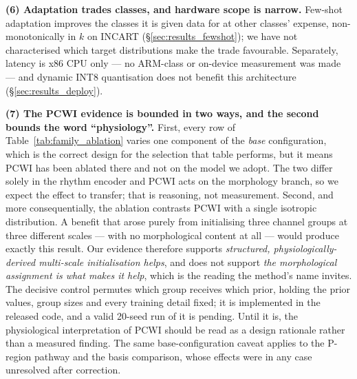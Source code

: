 \documentclass[journal,twoside,web]{ieeecolor}
\begin{document}
\noindent\textbf{(6) Adaptation trades classes, and hardware scope is narrow.} Few-shot adaptation improves the classes it is given data for at other classes' expense, non-monotonically in $k$ on INCART (\S\ref{sec:results_fewshot}); we have not characterised which target distributions make the trade favourable. Separately, latency is x86 CPU only --- no ARM-class or on-device measurement was made --- and dynamic INT8 quantisation does not benefit this architecture (\S\ref{sec:results_deploy}).

\noindent\textbf{(7) The PCWI evidence is bounded in two ways, and the second bounds the word ``physiology''.} First, every row of Table~\ref{tab:family_ablation} varies one component of the \emph{base} configuration, which is the correct design for the selection that table performs, but it means PCWI has been ablated there and not on the model we adopt. The two differ solely in the rhythm encoder and PCWI acts on the morphology branch, so we expect the effect to transfer; that is reasoning, not measurement. Second, and more consequentially, the ablation contrasts PCWI with a single isotropic distribution. A benefit that arose purely from initialising three channel groups at three different scales --- with no morphological content at all --- would produce exactly this result. Our evidence therefore supports \emph{structured, physiologically-derived multi-scale initialisation helps}, and does not support \emph{the morphological assignment is what makes it help}, which is the reading the method's name invites. The decisive control permutes which group receives which prior, holding the prior values, group sizes and every training detail fixed; it is implemented in the released code, and a valid 20-seed run of it is pending. Until it is, the physiological interpretation of PCWI should be read as a design rationale rather than a measured finding. The same base-configuration caveat applies to the P-region pathway and the basis comparison, whose effects were in any case unresolved after correction.
\end{document}
